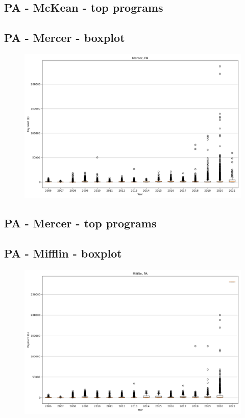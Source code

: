 \subsection*{PA - McKean - top programs}

\newpage
\subsection*{PA - Mercer - boxplot}
\begin{figure}[h]
\centering
\includegraphics[width=7in]{../output/boxplots/counties/Mercer-PA_boxplot.png}
\end{figure}


\subsection*{PA - Mercer - top programs}

\newpage
\subsection*{PA - Mifflin - boxplot}
\begin{figure}[h]
\centering
\includegraphics[width=7in]{../output/boxplots/counties/Mifflin-PA_boxplot.png}
\end{figure}



